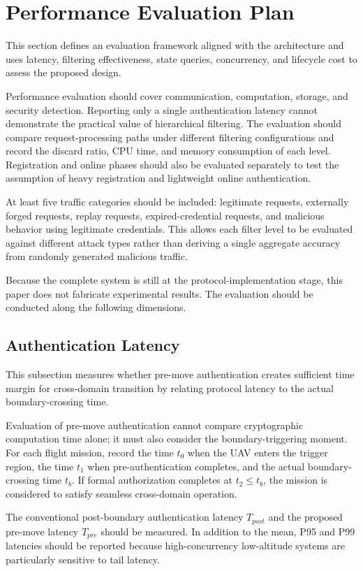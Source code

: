 \documentclass[lettersize,journal]{IEEEtran}
\begin{document}
	\section{Performance Evaluation Plan}
	This section defines an evaluation framework aligned with the architecture and uses latency, filtering effectiveness, state queries, concurrency, and lifecycle cost to assess the proposed design.
	
	
	Performance evaluation should cover communication, computation, storage, and security detection. Reporting only a single authentication latency cannot demonstrate the practical value of hierarchical filtering. The evaluation should compare request-processing paths under different filtering configurations and record the discard ratio, CPU time, and memory consumption of each level. Registration and online phases should also be evaluated separately to test the assumption of heavy registration and lightweight online authentication.
	
	At least five traffic categories should be included: legitimate requests, externally forged requests, replay requests, expired-credential requests, and malicious behavior using legitimate credentials. This allows each filter level to be evaluated against different attack types rather than deriving a single aggregate accuracy from randomly generated malicious traffic.
	
	Because the complete system is still at the protocol-implementation stage, this paper does not fabricate experimental results. The evaluation should be conducted along the following dimensions.
	
	\subsection{Authentication Latency}
	This subsection measures whether pre-move authentication creates sufficient time margin for cross-domain transition by relating protocol latency to the actual boundary-crossing time.
	
	
	Evaluation of pre-move authentication cannot compare cryptographic computation time alone; it must also consider the boundary-triggering moment. For each flight mission, record the time $t_0$ when the UAV enters the trigger region, the time $t_1$ when pre-authentication completes, and the actual boundary-crossing time $t_b$. If formal authorization completes at $t_2\le t_b$, the mission is considered to satisfy seamless cross-domain operation.
	
	The conventional post-boundary authentication latency $T_{post}$ and the proposed pre-move latency $T_{pre}$ should be measured. In addition to the mean, P95 and P99 latencies should be reported because high-concurrency low-altitude systems are particularly sensitive to tail latency.
	
\end{document}
